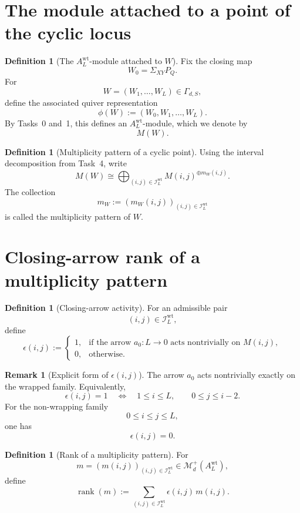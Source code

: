 \documentclass{article}
\newcommand{\rk}{\operatorname{rank}}
\theoremstyle{definition}
\newtheorem{definition}[theorem]{Definition}
\newtheorem{remark}[theorem]{Remark}
\begin{document}
\section{The module attached to a point of the cyclic locus}

\begin{definition}[The $A_L^{\mathrm{wt}}$-module attached to $W$]
Fix the closing map
\[
W_0=\Sigma_{XY}P_Q.
\]
For
\[
W=(W_1,\dots,W_L)\in \Gamma_{d,S},
\]
define the associated quiver representation
\[
\phi(W):=(W_0,W_1,\dots,W_L).
\]
By Tasks~0 and~1, this defines an $A_L^{\mathrm{wt}}$-module, which we denote by
\[
M(W).
\]
\end{definition}

\begin{definition}[Multiplicity pattern of a cyclic point]
Using the interval decomposition from Task~4, write
\[
M(W)
\cong
\bigoplus_{(i,j)\in \mathcal I_L^{\mathrm{wt}}}
M(i,j)^{\oplus m_W(i,j)}.
\]
The collection
\[
m_W:=(m_W(i,j))_{(i,j)\in \mathcal I_L^{\mathrm{wt}}}
\]
is called the multiplicity pattern of $W$.
\end{definition}

\section{Closing-arrow rank of a multiplicity pattern}

\begin{definition}[Closing-arrow activity]
For an admissible pair
\[
(i,j)\in \mathcal I_L^{\mathrm{wt}},
\]
define
\[
\epsilon(i,j)
:=
\begin{cases}
1, & \text{if the arrow $a_0:L\to 0$ acts nontrivially on } M(i,j),\\
0, & \text{otherwise}.
\end{cases}
\]
\end{definition}

\begin{remark}[Explicit form of $\epsilon(i,j)$]
The arrow $a_0$ acts nontrivially exactly on the wrapped family. Equivalently,
\[
\epsilon(i,j)=1
\quad\Longleftrightarrow\quad
1\le i\le L,\qquad 0\le j\le i-2.
\]
For the non-wrapping family
\[
0\le i\le j\le L,
\]
one has
\[
\epsilon(i,j)=0.
\]
\end{remark}

\begin{definition}[Rank of a multiplicity pattern]
For
\[
m=(m(i,j))_{(i,j)\in \mathcal I_L^{\mathrm{wt}}}
\in
\mathcal M_d^+(A_L^{\mathrm{wt}}),
\]
define
\[
\rk(m)
:=
\sum_{(i,j)\in \mathcal I_L^{\mathrm{wt}}}
\epsilon(i,j)\,m(i,j).
\]
\end{definition}
\end{document}
